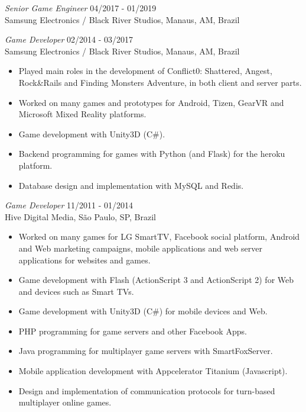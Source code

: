 \documentclass[line,margin]{res}
\begin{document}
\begin{resume}
		{\sl Senior Game Engineer} \hfill 04/2017 - 01/2019 \\
                Samsung Electronics / Black River Studios, Manaus, AM, Brazil

                {\sl Game Developer} \hfill 02/2014 - 03/2017 \\
                Samsung Electronics / Black River Studios, Manaus, AM, Brazil
                 \begin{itemize}  \itemsep 1.25pt
                 \item Played main roles in the development of Conflict0: Shattered, Angest, Rock\&Rails and Finding Monsters Adventure, in both client and server parts.
                 \item Worked on many games and prototypes for Android, Tizen, GearVR and Microsoft Mixed Reality platforms.
                 \item Game development with Unity3D (C\#).
		 \item Backend programming for games with Python (and Flask) for the heroku platform.
                 \item Database design and implementation with MySQL and Redis.
                 \end{itemize}
                 
		{\sl Game Developer} \hfill 11/2011 - 01/2014 \\
                Hive Digital Media, São Paulo, SP, Brazil
                 \begin{itemize}  \itemsep 1.25pt
                 \item Worked on many games for LG SmartTV, Facebook social platform, Android and Web marketing campaigns, mobile applications and web server applications for websites and games.
                 \item Game development with Flash (ActionScript 3 and ActionScript 2) for Web and devices such as Smart TVs.
 		 \item Game development with Unity3D (C\#) for mobile devices and Web.
                 \item PHP programming for game servers and other Facebook Apps.
                 \item Java programming for multiplayer game servers with SmartFoxServer.
 		 \item Mobile application development with Appcelerator Titanium (Javascript).
                 \item Design and implementation of communication protocols for turn-based multiplayer online games.
                 \end{itemize}
                 

\end{resume}
\end{document}
